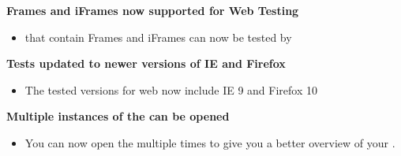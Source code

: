 \textbf{Frames and iFrames now supported for Web Testing}
\begin{itemize}
\item \gdauts{} that contain Frames and iFrames can now be tested by \app{}
\end{itemize}

\textbf{Tests updated to newer versions of IE and Firefox}
\begin{itemize}
\item The tested versions for web \gdauts{} now include IE 9 and Firefox 10
\end{itemize}

\textbf{Multiple instances of the \gdtestcasebrowser{} can be opened}
\begin{itemize}
\item You can now open the \gdtestcasebrowser{} multiple times to give you a better overview of your \gdcases{}. 
\end{itemize}
